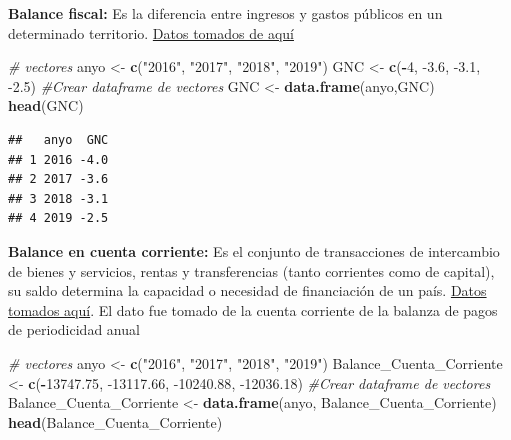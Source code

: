 \documentclass[
  11pt,
  a4paper,
]{book}
\newenvironment{Shaded}{\begin{snugshade}}{\end{snugshade}}
\newcommand{\CommentTok}[1]{\textcolor[rgb]{0.56,0.35,0.01}{\textit{#1}}}
\newcommand{\DecValTok}[1]{\textcolor[rgb]{0.00,0.00,0.81}{#1}}
\newcommand{\FloatTok}[1]{\textcolor[rgb]{0.00,0.00,0.81}{#1}}
\newcommand{\KeywordTok}[1]{\textcolor[rgb]{0.13,0.29,0.53}{\textbf{#1}}}
\newcommand{\NormalTok}[1]{#1}
\newcommand{\OperatorTok}[1]{\textcolor[rgb]{0.81,0.36,0.00}{\textbf{#1}}}
\newcommand{\StringTok}[1]{\textcolor[rgb]{0.31,0.60,0.02}{#1}}
\begin{document}
\textbf{Balance fiscal:} Es la diferencia entre ingresos y gastos
públicos en un determinado territorio.
\href{http://www.urf.gov.co/webcenter/portal/EntidadesFinancieras/pages_EntidadesFinancieras/PoliticaFiscal/bgg/balancefiscalgobiernocentral?_afrLoop=6729623401772216\&_afrWindowMode=2\&Adf-Window-Id=mof7t7k7j\&_afrFS=16\&_afrMT=screen\&_afrMFW=768\&_afrMFH=720\&_afrMFDW=1536\&_afrMFDH=864\&_afrMFC=8\&_afrMFCI=0\&_afrMFM=0\&_afrMFR=120\&_afrMFG=0\&_afrMFS=0\&_afrMFO=0}{Datos
tomados de aquí}

\begin{Shaded}
\begin{Highlighting}[]
\CommentTok{# vectores }
\NormalTok{anyo <-}\StringTok{ }\KeywordTok{c}\NormalTok{(}\StringTok{"2016"}\NormalTok{, }\StringTok{"2017"}\NormalTok{, }\StringTok{"2018"}\NormalTok{, }\StringTok{"2019"}\NormalTok{)}
\NormalTok{GNC <-}\StringTok{ }\KeywordTok{c}\NormalTok{(}\OperatorTok{-}\DecValTok{4}\NormalTok{, }\FloatTok{-3.6}\NormalTok{, }\FloatTok{-3.1}\NormalTok{, }\FloatTok{-2.5}\NormalTok{)}
\CommentTok{#Crear dataframe de vectores}
\NormalTok{GNC <-}\StringTok{ }\KeywordTok{data.frame}\NormalTok{(anyo,GNC)}
\KeywordTok{head}\NormalTok{(GNC)}
\end{Highlighting}
\end{Shaded}

\begin{verbatim}
##   anyo  GNC
## 1 2016 -4.0
## 2 2017 -3.6
## 3 2018 -3.1
## 4 2019 -2.5
\end{verbatim}

\textbf{Balance en cuenta corriente:} Es el conjunto de transacciones de
intercambio de bienes y servicios, rentas y transferencias (tanto
corrientes como de capital), su saldo determina la capacidad o necesidad
de financiación de un país.
\href{https://www.banrep.gov.co/es/estadisticas/balanza-pagos}{Datos
tomados aquí}. El dato fue tomado de la cuenta corriente de la balanza
de pagos de periodicidad anual

\begin{Shaded}
\begin{Highlighting}[]
\CommentTok{# vectores }
\NormalTok{anyo <-}\StringTok{ }\KeywordTok{c}\NormalTok{(}\StringTok{"2016"}\NormalTok{, }\StringTok{"2017"}\NormalTok{, }\StringTok{"2018"}\NormalTok{, }\StringTok{"2019"}\NormalTok{)}
\NormalTok{Balance_Cuenta_Corriente <-}\StringTok{ }\KeywordTok{c}\NormalTok{(}\OperatorTok{-}\FloatTok{13747.75}\NormalTok{, }\FloatTok{-13117.66}\NormalTok{, }\FloatTok{-10240.88}\NormalTok{, }\FloatTok{-12036.18}\NormalTok{)}
\CommentTok{#Crear dataframe de vectores}
\NormalTok{Balance_Cuenta_Corriente <-}\StringTok{ }\KeywordTok{data.frame}\NormalTok{(anyo, Balance_Cuenta_Corriente)}
\KeywordTok{head}\NormalTok{(Balance_Cuenta_Corriente)}
\end{Highlighting}
\end{Shaded}
\end{document}
